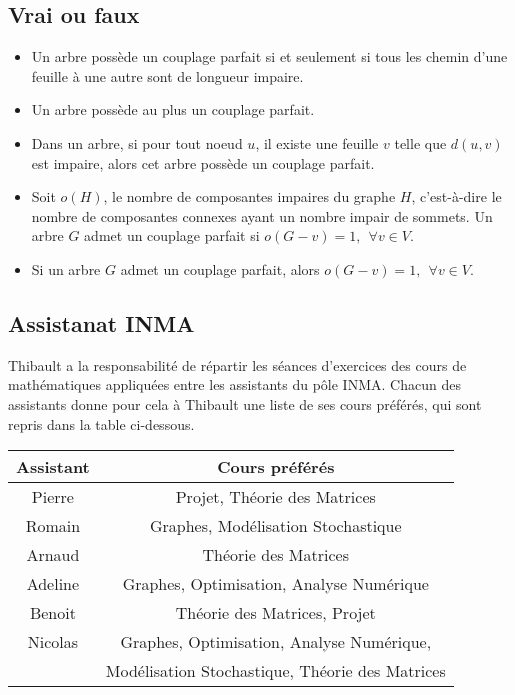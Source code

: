 \subsection{Vrai ou faux}

\begin{itemize}
  \item Un arbre possède un couplage parfait si et seulement si tous les chemin d'une feuille à une autre sont de longueur impaire.
  \item Un arbre possède au plus un couplage parfait.
  \item Dans un arbre, si pour tout noeud $u$, il existe une feuille $v$ telle que $d(u,v)$ est impaire, alors cet arbre possède un couplage parfait.
  \item Soit $o(H)$, le nombre de composantes impaires du graphe $H$, c'est-à-dire le nombre de composantes connexes ayant un nombre impair de sommets. Un arbre $G$ admet un couplage parfait si $o(G-v)=1,  \ \ \forall v \in V$.
  \item Si un arbre $G$ admet un couplage parfait, alors $o(G-v)=1, \ \ \forall v \in V$.
\end{itemize}


\subsection{Assistanat INMA}
Thibault a la responsabilité de répartir les séances d'exercices des cours de mathématiques appliquées entre les assistants du pôle INMA. Chacun des assistants donne pour cela à Thibault une liste de ses cours préférés, qui sont repris dans la table ci-dessous.

\begin{center}
  \begin{tabular}{|c|c|}
    \hline
    Assistant & Cours préférés \\
    \hline
    Pierre & Projet, Théorie des Matrices \\
    Romain & Graphes, Modélisation Stochastique \\
    Arnaud & Théorie des Matrices \\
    Adeline & Graphes, Optimisation, Analyse Numérique \\
    Benoit & Théorie des Matrices, Projet \\
    Nicolas & Graphes, Optimisation, Analyse Numérique, \\
            & Modélisation Stochastique, Théorie des Matrices  \\
    \hline
  \end{tabular}
\end{center}

